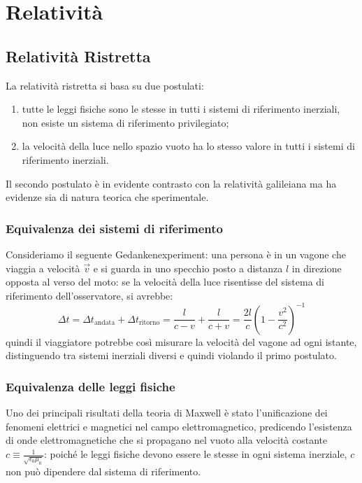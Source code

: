 \section{Relatività}

\subsection{Relatività Ristretta}
La relatività ristretta si basa su due postulati:
\begin{enumerate}
	\item tutte le leggi fisiche sono le stesse in tutti i sistemi di riferimento inerziali, non esiste un sistema di riferimento privilegiato;
	\item la velocità della luce nello spazio vuoto ha lo stesso valore in tutti i sistemi di riferimento inerziali.
\end{enumerate}
Il secondo postulato è in evidente contrasto con la relatività galileiana ma ha evidenze sia di natura teorica che sperimentale.

\subsubsection{Equivalenza dei sistemi di riferimento}

Consideriamo il seguente Gedankenexperiment: una persona è in un vagone che viaggia a velocità $ \vec{v} $ e si guarda in uno specchio posto a distanza $ l $ in direzione opposta al verso del moto: se la velocità della luce risentisse del sistema di riferimento dell'osservatore, si avrebbe:
\begin{equation}
	\Delta t = \Delta t_{\text{andata}} + \Delta t_{\text{ritorno}} = \frac{l}{c - v} + \frac{l}{c + v} = \frac{2l}{c} \left( 1 - \frac{v^2}{c^2}\right)^{-1}
	\label{eq:1}
\end{equation}
quindi il viaggiatore potrebbe così misurare la velocità del vagone ad ogni istante, distinguendo tra sistemi inerziali diversi e quindi violando il primo postulato.

\subsubsection{Equivalenza delle leggi fisiche}

Uno dei principali risultati della teoria di Maxwell è stato l'unificazione dei fenomeni elettrici e magnetici nel campo elettromagnetico, predicendo l'esistenza di onde elettromagnetiche che si propagano nel vuoto alla velocità costante $ c \equiv \frac{1}{\sqrt{\epsilon_0\mu_0}} $: poiché le leggi fisiche devono essere le stesse in ogni sistema inerziale, $ c $ non può dipendere dal sistema di riferimento.

